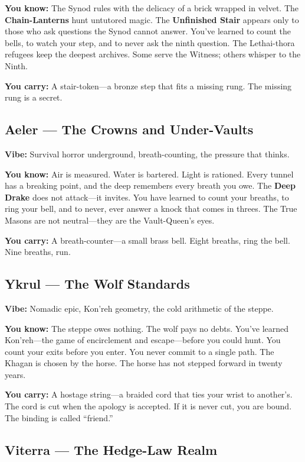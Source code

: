 \documentclass[10pt]{article}
\begin{document}
\textbf{You know:} The Synod rules with the delicacy of a brick wrapped in velvet. 
The \textbf{Chain-Lanterns} hunt untutored magic. The \textbf{Unfinished Stair} appears 
only to those who ask questions the Synod cannot answer. You've learned to count the 
bells, to watch your step, and to never ask the ninth question. The Lethai-thora 
refugees keep the deepest archives. Some serve the Witness; others whisper to the Ninth.

\textbf{You carry:} A stair-token—a bronze step that fits a missing rung. The 
missing rung is a secret.

\subsection*{Aeler --- The Crowns and Under-Vaults}

\textbf{Vibe:} Survival horror underground, breath-counting, the pressure that thinks.

\textbf{You know:} Air is measured. Water is bartered. Light is rationed. Every 
tunnel has a breaking point, and the deep remembers every breath you owe. The 
\textbf{Deep Drake} does not attack—it invites. You have learned to count your 
breaths, to ring your bell, and to never, ever answer a knock that comes in threes. 
The True Masons are not neutral—they are the Vault-Queen's eyes.

\textbf{You carry:} A breath-counter—a small brass bell. Eight breaths, ring the 
bell. Nine breaths, run.

\subsection*{Ykrul --- The Wolf Standards}

\textbf{Vibe:} Nomadic epic, Kon'reh geometry, the cold arithmetic of the steppe.

\textbf{You know:} The steppe owes nothing. The wolf pays no debts. You've learned 
Kon'reh—the game of encirclement and escape—before you could hunt. You count your 
exits before you enter. You never commit to a single path. The Khagan is chosen by 
the horse. The horse has not stepped forward in twenty years.

\textbf{You carry:} A hostage string—a braided cord that ties your wrist to 
another's. The cord is cut when the apology is accepted. If it is never cut, 
you are bound. The binding is called ``friend.''

\subsection*{Viterra --- The Hedge-Law Realm}
\end{document}
